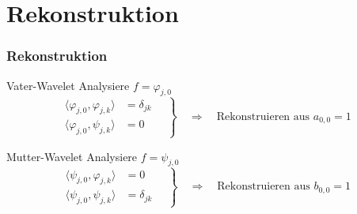 %
%
%
\section{Rekonstruktion}

%
%
\begin{frame}
\frametitle{Rekonstruktion}
\begin{block}{Vater-Wavelet}
Analysiere $f = \varphi_{j,0}$
\[
\left.
\begin{aligned}
\langle\varphi_{j,0},\varphi_{j,k}\rangle&=\delta_{jk}
\\
\langle\varphi_{j,0},\psi_{j,k}\rangle&=0
\end{aligned}
\quad
\right\}
\quad \Rightarrow \quad
\text{Rekonstruieren aus $a_{0,0}=1$}
\]
\end{block}

\begin{block}{Mutter-Wavelet}
Analysiere $f = \psi_{j,0}$
\[
\left.
\begin{aligned}
\langle\psi_{j,0},\varphi_{j,k}\rangle&=0
\\
\langle\psi_{j,0},\psi_{j,k}\rangle&=\delta_{jk}
\end{aligned}
\quad
\right\}
\quad \Rightarrow \quad
\text{Rekonstruieren aus $b_{0,0}=1$}
\]
\end{block}

\end{frame}

